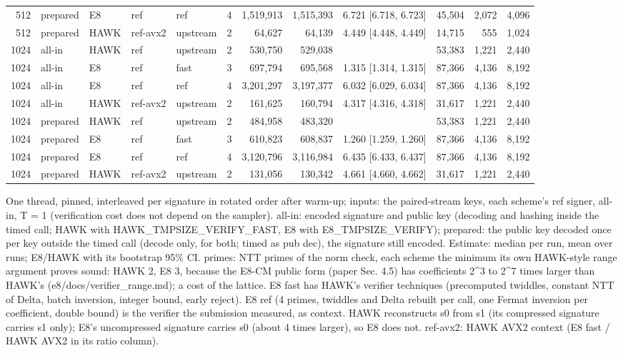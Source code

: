 \begin{table}[t]
{\begin{tabular}{rllllrrrlrrr}
512 & prepared & E8 & ref & ref & 4 & 1{,}519{,}913 & 1{,}515{,}393 & 6.721 [6.718, 6.723] & 45{,}504 & 2{,}072 & 4{,}096 \\
512 & prepared & HAWK & ref-avx2 & upstream & 2 & 64{,}627 & 64{,}139 & 4.449 [4.448, 4.449] & 14{,}715 & 555 & 1{,}024 \\
1024 & all-in & HAWK & ref & upstream & 2 & 530{,}750 & 529{,}038 &  & 53{,}383 & 1{,}221 & 2{,}440 \\
1024 & all-in & E8 & ref & fast & 3 & 697{,}794 & 695{,}568 & 1.315 [1.314, 1.315] & 87{,}366 & 4{,}136 & 8{,}192 \\
1024 & all-in & E8 & ref & ref & 4 & 3{,}201{,}297 & 3{,}197{,}377 & 6.032 [6.029, 6.034] & 87{,}366 & 4{,}136 & 8{,}192 \\
1024 & all-in & HAWK & ref-avx2 & upstream & 2 & 161{,}625 & 160{,}794 & 4.317 [4.316, 4.318] & 31{,}617 & 1{,}221 & 2{,}440 \\
1024 & prepared & HAWK & ref & upstream & 2 & 484{,}958 & 483{,}320 &  & 53{,}383 & 1{,}221 & 2{,}440 \\
1024 & prepared & E8 & ref & fast & 3 & 610{,}823 & 608{,}837 & 1.260 [1.259, 1.260] & 87{,}366 & 4{,}136 & 8{,}192 \\
1024 & prepared & E8 & ref & ref & 4 & 3{,}120{,}796 & 3{,}116{,}984 & 6.435 [6.433, 6.437] & 87{,}366 & 4{,}136 & 8{,}192 \\
1024 & prepared & HAWK & ref-avx2 & upstream & 2 & 131{,}056 & 130{,}342 & 4.661 [4.660, 4.662] & 31{,}617 & 1{,}221 & 2{,}440 \\
\bottomrule
\end{tabular}}
\par\smallskip\parbox{\linewidth}{\scriptsize One thread, pinned, interleaved per signature in rotated order after warm-up; inputs: the paired-stream keys, each scheme's ref signer, all-in, T = 1 (verification cost does not depend on the sampler). all-in: encoded signature and public key (decoding and hashing inside the timed call; HAWK with HAWK\_TMPSIZE\_VERIFY\_FAST, E8 with E8\_TMPSIZE\_VERIFY); prepared: the public key decoded once per key outside the timed call (decode only, for both; timed as pub dec), the signature still encoded. Estimate: median per run, mean over runs; E8/HAWK with its bootstrap 95\% CI. primes: NTT primes of the norm check, each scheme the minimum its own HAWK-style range argument proves sound: HAWK 2, E8 3, because the E8-CM public form (paper Sec. 4.5) has coefficients 2^3 to 2^7 times larger than HAWK's (e8/docs/verifier\_range.md); a cost of the lattice. E8 fast has HAWK's verifier techniques (precomputed twiddles, constant NTT of Delta, batch inversion, integer bound, early reject). E8 ref (4 primes, twiddles and Delta rebuilt per call, one Fermat inversion per coefficient, double bound) is the verifier the submission measured, as context. HAWK reconstructs s0 from s1 (its compressed signature carries s1 only); E8's uncompressed signature carries s0 (about 4 times larger), so E8 does not. ref-avx2: HAWK AVX2 context (E8 fast / HAWK AVX2 in its ratio column).}
\end{table}

